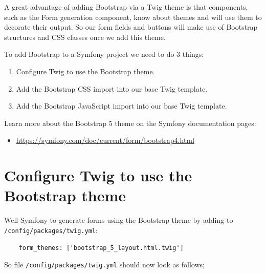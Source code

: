 \documentclass[a4paperpaper,openright]{book}
\newenvironment{Shaded}{}{}
\newcommand{\AttributeTok}[1]{\textcolor[rgb]{0.49,0.56,0.16}{#1}}
\newcommand{\CharTok}[1]{\textcolor[rgb]{0.25,0.44,0.63}{#1}}
\newcommand{\FunctionTok}[1]{\textcolor[rgb]{0.02,0.16,0.49}{#1}}
\newcommand{\KeywordTok}[1]{\textcolor[rgb]{0.00,0.44,0.13}{\textbf{#1}}}
\newcommand{\StringTok}[1]{\textcolor[rgb]{0.25,0.44,0.63}{#1}}
\providecommand{\tightlist}{%
  \setlength{\itemsep}{0pt}\setlength{\parskip}{0pt}}
\begin{document}
A great advantage of adding Bootstrap via a Twig theme is that
components, such as the Form generation component, know about themes and
will use them to decorate their output. So our form fields and buttons
will make use of Bootstrap structures and CSS classes once we add this
theme.

To add Bootstrap to a Symfony project we need to do 3 things:

\begin{enumerate}
\def\labelenumi{\arabic{enumi}.}
\item
  Configure Twig to use the Bootstrap theme.
\item
  Add the Bootstrap CSS import into our base Twig template.
\item
  Add the Bootstrap JavaScript import into our base Twig template.
\end{enumerate}

Learn more about the Bootstrap 5 theme on the Symfony documentation
pages:

\begin{itemize}
\tightlist
\item
  \url{https://symfony.com/doc/current/form/bootstrap4.html}
\end{itemize}

\hypertarget{configure-twig-to-use-the-bootstrap-theme}{%
\section{Configure Twig to use the Bootstrap
theme}\label{configure-twig-to-use-the-bootstrap-theme}}

Well Symfony to generate forms using the Bootstrap theme by adding to
\texttt{/config/packages/twig.yml}:

\begin{verbatim}
    form_themes: ['bootstrap_5_layout.html.twig']
\end{verbatim}

So file \texttt{/config/packages/twig.yml} should now look as follows;

\begin{Shaded}
\end{Shaded}
\end{document}
